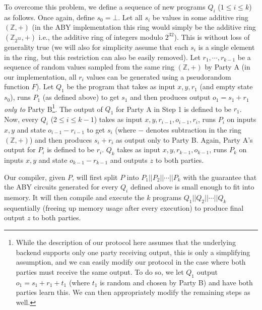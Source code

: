To overcome this problem, we define a sequence of new programs $Q_i$ ($1\leq i\leq k$) as follows. Once again, define $s_0 = \bot$. Let all $s_i$ be values in some additive ring $(\mathbb{Z},+)$ (in the ABY implementation this ring would simply be the additive ring $(\mathbb{Z}_{2^{32}},+)$ i.e., the additive ring of integers modulo $2^{32}$). This is without loss of generality true (we will also for simplicity assume that each $s_i$ is a single element in the ring, but this restriction can also be easily removed). Let $r_1,\cdots,r_{k-1}$ be a sequence of random values sampled from the same ring $(\mathbb{Z},+)$ by Party A (in our implementation, all $r_i$ values can be generated using a pseudorandom function $F$). Let $Q_1$ be the program that takes as input $x,y, r_1$ (and empty state $s_0$), runs $P_1$ (as defined above) to get $s_1$ and then produces output $o_1 = s_1 + r_1$ {\em only to} Party B\footnote{While the description of our protocol here assumes that the underlying backend supports only one party receiving output, this is only a simplifying assumption, and we can easily modify our protocol in the case where both parties must receive the same output. To do so, we let $Q_1$ output $o_1 = s_1+r_1+t_1$ (where $t_1$ is random and chosen by Party B) and have both parties learn this. We can then appropriately modify the remaining steps as well.}. The output of $Q_1$ for Party A in Step 1 is defined to be $r_1$. Now, every $Q_i$ ($2\leq i\leq k-1$) takes as input $x,y,r_{i-1},o_{i-1},r_i$, runs $P_i$ on inputs $x,y$ and state $o_{i-1}-r_{i-1}$ to get $s_i$ (where $-$ denotes subtraction in the ring $(\mathbb{Z},+)$) and then produces $s_i+r_i$ as output only to Party B. Again, Party A's output for $P_i$ is defined to be $r_i$. $Q_k$ takes as input $x,y,r_{k-1},o_{k-1}$, runs $P_k$ on inputs $x,y$ and state $o_{k-1}-r_{k-1}$ and outputs $z$ to both parties.

Our compiler, given $P$, will first split $P$ into $P_1||P_2||\cdots||P_k$ with the guarantee that the ABY circuits generated for every $Q_i$ defined above is small enough to fit into memory. It will then compile and execute the $k$ programs $Q_1||Q_2||\cdots||Q_k$ sequentially (freeing up memory usage after every execution) to produce final output $z$ to both parties.
